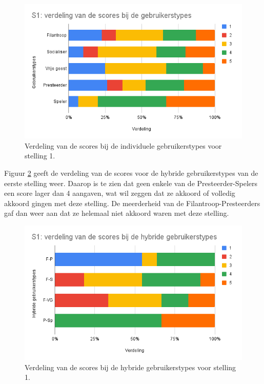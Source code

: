 \begin{figure}
    \includegraphics[width=\linewidth]{S1.png}
    \caption{Verdeling van de scores bij de individuele gebruikerstypes voor stelling 1.}
    \label{fig:s1}
\end{figure}

Figuur \ref{fig:s1_hybride} geeft de verdeling van de scores voor de hybride gebruikerstypes van de eerste stelling weer. Daarop is te zien dat geen enkele van de Presteerder-Spelers een score lager dan 4 aangaven, wat wil zeggen dat ze akkoord of volledig akkoord gingen met deze stelling. De meerderheid van de Filantroop-Presteerders gaf dan weer aan dat ze helemaal niet akkoord waren met deze stelling.

\begin{figure}
    \includegraphics[width=\linewidth]{S1_Hybride.png}
    \caption{Verdeling van de scores bij de hybride gebruikerstypes voor stelling 1.}
    \label{fig:s1_hybride}
\end{figure}

